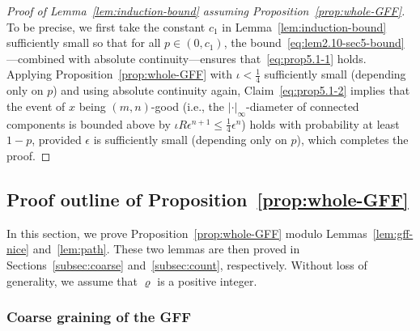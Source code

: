 \documentclass[a4paper]{article}
\numberwithin{equation}{section}
\numberwithin{equation}{section}
\renewcommand{\1}{\mathbf{1}}
\begin{document}
\begin{proof}[Proof of Lemma~\ref{lem:induction-bound} assuming Proposition~\ref{prop:whole-GFF}]
    To be precise, we first take the constant $c_1$ in Lemma~\ref{lem:induction-bound} sufficiently small so that for all $p \in (0,c_1)$, the bound~\eqref{eq:lem2.10-sec5-bound}---combined with absolute continuity---ensures that~\eqref{eq:prop5.1-1} holds. Applying Proposition~\ref{prop:whole-GFF} with $\iota< \frac{1}{4}$ sufficiently small (depending only on $p$) and using absolute continuity again, Claim~\eqref{eq:prop5.1-2} implies that the event of $x$ being $(m,n)$-good (i.e., the $|\cdot|_\infty$-diameter of connected components is bounded above by $\iota R \epsilon^{n + 1} \leq \frac{1}{4} \epsilon^{n}$) holds with probability at least $1-p$, provided $\epsilon$ is sufficiently small (depending only on $p$), which completes the proof.
\end{proof}


\subsection{Proof outline of Proposition~\ref{prop:whole-GFF}}\label{subsec:outline-prop5.1}

In this section, we prove Proposition~\ref{prop:whole-GFF} modulo Lemmas~\ref{lem:gff-nice} and~\ref{lem:path}. These two lemmas are then proved in Sections~\ref{subsec:coarse} and~\ref{subsec:count}, respectively. Without loss of generality, we assume that $\varrho$ is a positive integer.

\subsubsection{Coarse graining of the GFF}
\end{document}

